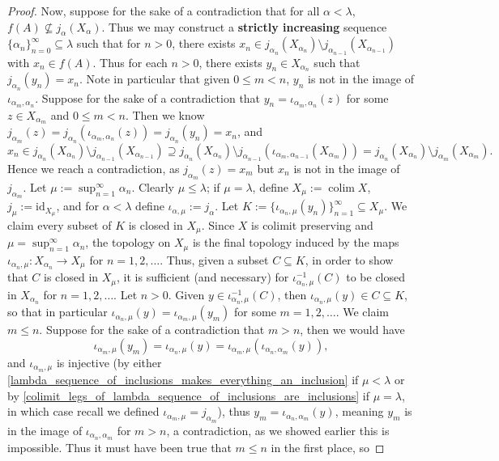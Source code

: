 \documentclass{amsart}
\theoremstyle{plain}
\theoremstyle{definition}
\newcommand{\sseq}{\subseteq}
\newcommand{\spseq}{\supseteq}
\newcommand{\0}{\mathbf{0}}
\newcommand{\id}{\mathrm{id}}
\renewcommand{\(}{\left(}
\renewcommand{\)}{\right)}
\DeclareMathOperator*{\colim}{colim}
\begin{document}
\begin{proof}
  Now, suppose for the sake of a contradiction that for all $\alpha<\lambda$, $f(A)\not\sseq j_\alpha(X_\alpha)$. Thus we may construct a \textbf{strictly increasing} sequence $\{\alpha_n\}_{n=0}^\infty\sseq\lambda$ such that for $n>0$, there exists $x_n\in j_{\alpha_n}(X_{\alpha_n})\setminus j_{\alpha_{n-1}}(X_{\alpha_{n-1}})$ with $x_n\in f(A)$. Thus for each $n>0$, there exists $y_n\in X_{\alpha_n}$ such that $j_{\alpha_n}(y_n)=x_n$. Note in particular that given $0\leq m<n$, $y_n$ is not in the image of $\iota_{\alpha_m,\alpha_n}$. Suppose for the sake of a contradiction that $y_n=\iota_{\alpha_m,\alpha_n}(z)$ for some $z\in X_{\alpha_m}$ and $0\leq m<n$. Then we know $j_{\alpha_m}(z)=j_{\alpha_n}(\iota_{\alpha_m,\alpha_n}(z))=j_{\alpha_n}(y_n)=x_n$, and
  \[x_n\in j_{\alpha_n}(X_{\alpha_n})\setminus j_{\alpha_{n-1}}(X_{\alpha_{n-1}})\spseq j_{\alpha_n}(X_{\alpha_n})\setminus j_{\alpha_{n-1}}(\iota_{\alpha_m,\alpha_{n-1}}(X_{\alpha_m}))=j_{\alpha_n}(X_{\alpha_n})\setminus j_{\alpha_{m}}(X_{\alpha_m}).\]
  Hence we reach a contradiction, as $j_{\alpha_m}(z)=x_m$ but $x_n$ is not in the image of $j_{\alpha_m}$. Let $\mu:=\sup_{n=1}^\infty\alpha_n$. Clearly $\mu\leq\lambda$; if $\mu=\lambda$, define $X_\mu:=\colim X$, $j_\mu:=\id_{X_\mu}$, and for $\alpha<\lambda$ define $\iota_{\alpha,\mu}:=j_\alpha$. Let $K:=\{\iota_{\alpha_n,\mu}(y_n)\}_{n=1}^\infty\sseq X_\mu$. We claim every subset of $K$ is closed in $X_\mu$. Since $X$ is colimit preserving and $\mu=\sup_{n=1}^\infty\alpha_n$, the topology on $X_\mu$ is the final topology induced by the maps $\iota_{\alpha_n,\mu}:X_{\alpha_n}\to X_\mu$ for $n=1,2,\ldots$. Thus, given a subset $C\sseq K$, in order to show that $C$ is closed in $X_\mu$, it is sufficient (and necessary) for $\iota_{\alpha_n,\mu}^{-1}(C)$ to be closed in $X_{\alpha_n}$ for $n=1,2,\ldots$. Let $n>0$. Given $y\in\iota_{\alpha_n,\mu}^{-1}(C)$, then $\iota_{\alpha_n,\mu}(y)\in C\sseq K$, so that in particular $\iota_{\alpha_n,\mu}(y)=\iota_{\alpha_m,\mu}(y_m)$ for some $m=1,2,\ldots$. We claim $m\leq n$. Suppose for the sake of a contradiction that $m>n$, then we would have 
  \[\iota_{\alpha_m,\mu}(y_m)=\iota_{\alpha_n,\mu}(y)=\iota_{\alpha_m,\mu}(\iota_{\alpha_n,\alpha_m}(y)),\]
  and $\iota_{\alpha_m,\mu}$ is injective (by either \autoref{lambda_sequence_of_inclusions_makes_everything_an_inclusion} if $\mu<\lambda$ or by \autoref{colimit_legs_of_lambda_sequence_of_inclusions_are_inclusions} if $\mu=\lambda$, in which case recall we defined $\iota_{\alpha_m,\mu}=j_{\alpha_m}$), thus $y_m=\iota_{\alpha_n,\alpha_m}(y)$, meaning $y_m$ is in the image of $\iota_{\alpha_n,\alpha_m}$ for $m>n$, a contradiction, as we showed earlier this is impossible. Thus it must have been true that $m\leq n$ in the first place, so 

\end{proof}
\end{document}
